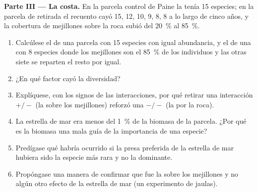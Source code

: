 \begin{problem}
\medskip
\noindent\textbf{Parte III --- La costa.}
En la parcela control de Paine la  tenía 15 especies; en la parcela
de retirada el recuento cayó 15, 12, 10, 9, 8, 8 a lo largo de cinco años, y
la cobertura de mejillones sobre la roca subió del \qty{20}{\%} al \qty{85}{\%}.
\begin{enumerate}[resume]
  \item Calcúlese el  de una parcela con 15 especies con
        igual abundancia, y el de una con 8 especies donde los mejillones
        son el \qty{85}{\%} de los individuos y las otras siete se reparten
        el resto por igual.
  \item ¿En qué factor cayó la diversidad?
  \item Explíquese, con los signos de las interacciones, por qué retirar una
        interacción $+/-$ (la  sobre los mejillones) reforzó una
        $-/-$ (la  por la roca).
  \item La estrella de mar era menos del \qty{1}{\%} de la biomasa de la
        parcela. ¿Por qué es la biomasa una mala guía de la importancia de
        una especie?
  \item Predígase qué habría ocurrido si la presa preferida de la estrella
        de mar hubiera sido la especie más rara y no la dominante.
  \item Propóngase una manera de confirmar que fue la  sobre los
        mejillones y no algún otro efecto de la estrella de mar (un
        experimento de jaulas).
\end{enumerate}


\end{problem}
